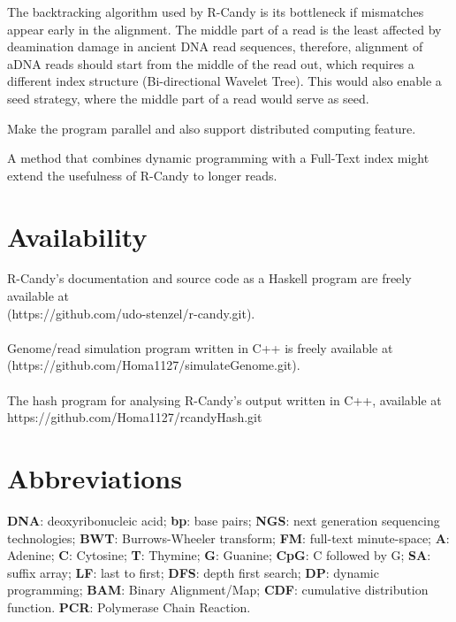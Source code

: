 \documentclass[11pt,a4paper]{report}
\begin{document}

The backtracking algorithm used by R-Candy is its bottleneck if mismatches 
appear early in the alignment.  The middle part of a read is the least
affected by deamination damage in ancient DNA read sequences,
therefore, alignment of aDNA reads should start from the middle of the read 
out, which requires a different index structure (Bi-directional Wavelet Tree).
This would also enable a seed strategy, where the middle part of a read
would serve as seed.

Make the program parallel and also support distributed computing feature. 

A method that combines dynamic programming with a Full-Text index might extend
the usefulness of R-Candy to longer reads.


\section{Availability} \label{Availability}

R-Candy's documentation and source code as a Haskell program are freely
available at\\
 (https://github.com/udo-stenzel/r-candy.git).
\\\\
Genome/read simulation program written in C++ is freely available at
(https://github.com/Homa1127/simulateGenome.git).
\\\\
The hash program for analysing R-Candy's output written in C++, available at
https://github.com/Homa1127/rcandyHash.git




\section{Abbreviations} \label{Abbreviations}

\textbf{DNA}: deoxyribonucleic acid;
\textbf{bp}: base pairs;
\textbf{NGS}: next generation sequencing technologies;
\textbf{BWT}: Burrows-Wheeler transform;
\textbf{FM}: full-text minute-space;
\textbf{A}: Adenine;
\textbf{C}: Cytosine;
\textbf{T}: Thymine;
\textbf{G}: Guanine;
\textbf{CpG}: C followed by G;
\textbf{SA}: suffix array;
\textbf{LF}: last to first;
\textbf{DFS}: depth first search;
\textbf{DP}: dynamic programming;
\textbf{BAM}: Binary Alignment/Map;
\textbf{CDF}: cumulative distribution function.
\textbf{PCR}: Polymerase Chain Reaction.
\end{document}
